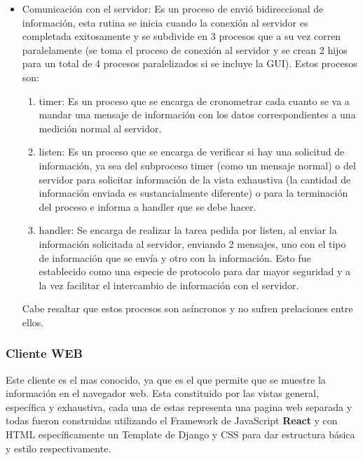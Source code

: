 \begin{itemize}
    \item Comunicación con el servidor: Es un proceso de envió bidireccional
        de información, esta rutina se inicia cuando la conexión al servidor
        es completada exitosamente y se subdivide en 3 procesos que a su
        vez corren paralelamente (se toma el proceso de conexión al servidor
        y se crean 2 hijos para un total de 4 procesos paralelizados si se
        incluye la GUI). Estos procesos son:

        \begin{enumerate}
            \item timer: Es un proceso que se encarga de cronometrar cada cuanto
                se va a mandar una mensaje de información con los datos
                correspondientes a una medición normal al servidor.

            \item listen: Es un proceso que se encarga de verificar si hay una
                solicitud de información, ya sea del subproceso timer (como un
                mensaje normal) o del servidor para solicitar información de la
                vista exhaustiva (la cantidad de información enviada es sustancialmente
                diferente) o para la terminación del proceso e informa a handler
                que se debe hacer.

            \item handler: Se encarga de realizar la tarea pedida por listen,
                al enviar la información solicitada al servidor, enviando 2 mensajes,
                uno con el tipo de información que se envía y otro con la información.
                Esto fue establecido como una especie de protocolo para dar mayor
                seguridad y a la vez facilitar el intercambio de información con
                el servidor.
        \end{enumerate}

        Cabe resaltar que estos procesos son asíncronos y no sufren prelaciones
        entre ellos.
\end{itemize}

\subsubsection{Cliente WEB}

Este cliente es el mas conocido, ya que es el que permite que se muestre la
información en el navegador web. Esta constituido por las vistas general,
específica y exhaustiva, cada una de estas representa una pagina web separada y
todas fueron construidas utilizando el Framework de JavaScript \textbf{React}
y con HTML específicamente un Template de Django y CSS para dar estructura
básica y estilo respectivamente.

